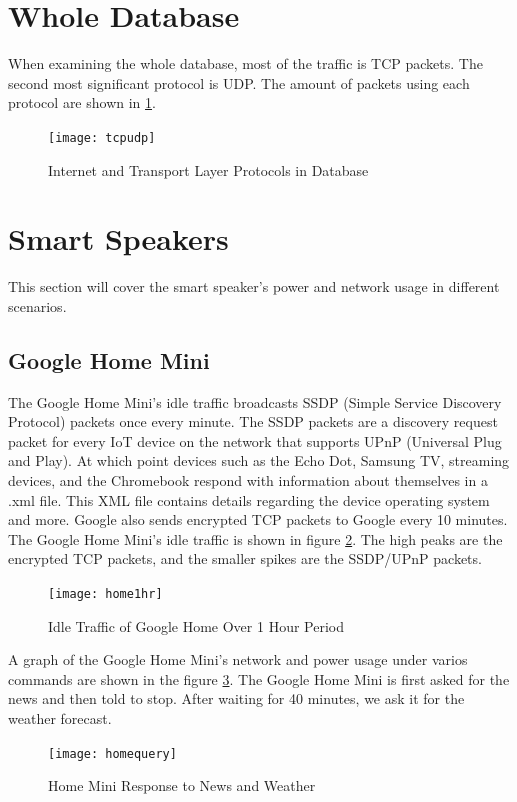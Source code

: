\section{Whole Database}
\label{wholeDB}
When examining the whole database, most of the traffic is TCP packets. The second most significant protocol is UDP. The amount of packets using each protocol are shown in \ref{fig:tcpudp}.

\label{Whole Database}
\begin{figure}[H]
  \centering
    \texttt{[image: tcpudp]}
  \caption{Internet and Transport Layer Protocols in Database}
  \label{fig:tcpudp}
\end{figure}

\section{Smart Speakers}
\label{smartSpeakerResults}
This section will cover the smart speaker's power and network usage in different scenarios.

\subsection{Google Home Mini}
The Google Home Mini's idle traffic broadcasts SSDP (Simple Service Discovery Protocol) packets once every minute. The SSDP packets are a discovery request packet for every IoT device on the network that supports UPnP (Universal Plug and Play). At which point devices such as the Echo Dot, Samsung TV, streaming devices, and the Chromebook respond with information about themselves in a .xml file. This XML file contains details regarding the device operating system and more. Google also sends encrypted TCP packets to Google every 10 minutes. The Google Home Mini's idle traffic is shown in figure \ref{fig:home}. The high peaks are the encrypted TCP packets, and the smaller spikes are the SSDP/UPnP packets.

\begin{figure}[H]
  \centering
    \texttt{[image: home1hr]}
  \caption{Idle Traffic of Google Home Over 1 Hour Period}
  \label{fig:home}
\end{figure}

A graph of the Google Home Mini's network and power usage under varios commands are shown in the figure \ref{fig:homequery}. The Google Home Mini is first asked for the news and then told to stop. After waiting for 40 minutes, we ask it for the weather forecast.

\begin{figure}[H]
  \centering
    \texttt{[image: homequery]}
  \caption{Home Mini Response to News and Weather}
  \label{fig:homequery}
\end{figure}

